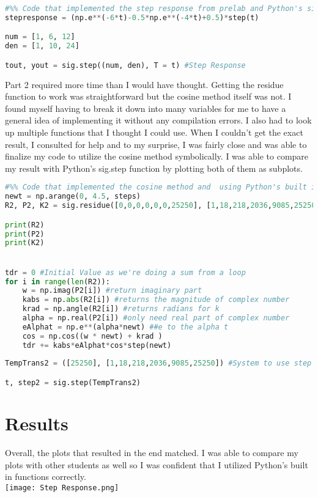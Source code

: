 \documentclass[12pt]{report}
\begin{document}
\begin{lstlisting}[language=Python]
#%% Code that implemented the step response from prelab and Python's sig.step function
stepresponse = (np.e**(-6*t)-0.5*np.e**(-4*t)+0.5)*step(t)

num = [1, 6, 12]
den = [1, 10, 24]

tout, yout = sig.step((num, den), T = t) #Step Response
\end{lstlisting}
Part 2 required more time than I would have thought. Getting the residue function to work was straightforward but the cosine method itself was not. I found myself having to break it down into many variables for me to have a general idea of implementing it without any compilation errors. I also had to look up multiple functions that I thought I could use. When I couldn't get the exact result, I consulted for help and to my surprise, I was fairly close and was able to finalize my code to utilize the cosine method symbolically. I was able to compare my result with Python's sig.step function by plotting both of them as subplots. 
\begin{lstlisting}[language=Python]
#%% Code that implemented the cosine method and  using Python's built in step function
newt = np.arange(0, 4.5, steps)
R2, P2, K2 = sig.residue([0,0,0,0,0,0,25250], [1,18,218,2036,9085,25250,0])

print(R2)
print(P2)
print(K2)


tdr = 0 #Initial Value as we're doing a sum from a loop
for i in range(len(R2)):
    w = np.imag(P2[i]) #return imaginary part 
    kabs = np.abs(R2[i]) #returns the magnitude of complex number
    krad = np.angle(R2[i]) #returns radians for k
    alpha = np.real(P2[i]) #only need real part of complex number
    eAlphat = np.e**(alpha*newt) ##e to the alpha t
    cos = np.cos((w * newt) + krad )
    tdr += kabs*eAlphat*cos*step(newt)
    
TempTrans2 = ([25250], [1,18,218,2036,9085,25250]) #System to use step function on

t, step2 = sig.step(TempTrans2)
\end{lstlisting}
\section{Results}

Overall, the plots that resulted in the end matched. I was able to compare my plots with other students as well so I was confident that I utilized Python's built in functions correctly.   
\\ \texttt{[image: Step Response.png]}
\end{document}
